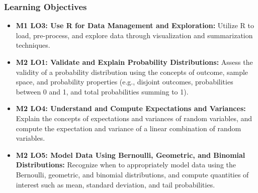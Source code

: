 \begin{frame}
    \frametitle{Learning Objectives}
    \begin{itemize}
        \item \textbf{M1 LO3: Use R for Data Management and Exploration:} Utilize R to load, pre-process, and explore data through visualization and summarization techniques.
        \item \textbf{M2 LO1: Validate and Explain Probability Distributions:} Assess the validity of a probability distribution using the concepts of outcome, sample space, and probability properties (e.g., disjoint outcomes, probabilities between 0 and 1, and total probabilities summing to 1).
        \item \textbf{M2 LO4: Understand and Compute Expectations and Variances:} Explain the concepts of expectations and variances of random variables, and compute the expectation and variance of a linear combination of random variables.
        \item \textbf{M2 LO5: Model Data Using Bernoulli, Geometric, and Binomial Distributions:} Recognize when to appropriately model data using the Bernoulli, geometric, and binomial distributions, and compute quantities of interest such as mean, standard deviation, and tail probabilities.
    \end{itemize}
\end{frame}

